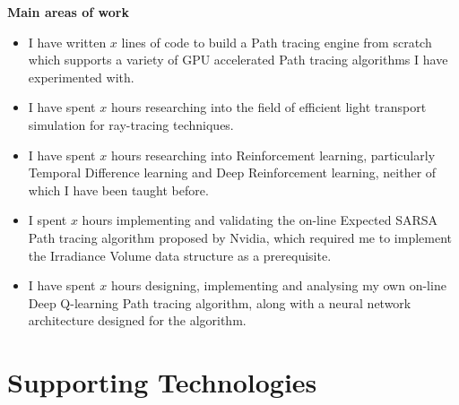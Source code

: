 \documentclass[ %
                    author={Callum Pearce},
                supervisor={Dr. Neill Campbell},
                    degree={MEng},
                     title={How effective are Temporal difference learning methods for reducing the number of zero contribution light paths, while still accurately approximating Global Illumination in Path tracing?},
                  subtitle={},
                      type={research},
                      year={2019} ]{dissertation}
\begin{document}
\noindent
\textbf{Main areas of work}
\begin{itemize}
\item I have written $x$ lines of code to build a  Path tracing engine from scratch which supports a variety of GPU accelerated Path tracing algorithms I have experimented with.

\item I have spent $x$ hours researching into the field of efficient light transport simulation for ray-tracing techniques.

\item I have spent $x$ hours researching into Reinforcement learning, particularly Temporal Difference learning and Deep Reinforcement learning, neither of which I have been taught before.

\item I spent $x$ hours implementing and validating the on-line Expected SARSA Path tracing algorithm proposed by Nvidia, which required me to implement the Irradiance Volume data structure as a prerequisite.

\item I have spent $x$ hours designing, implementing and analysing my own on-line Deep Q-learning Path tracing algorithm, along with a neural network architecture
designed for the algorithm.

\end{itemize}



\chapter*{Supporting Technologies}
\end{document}
